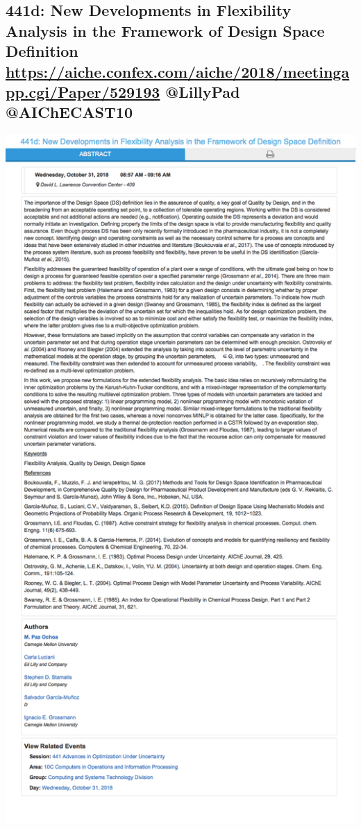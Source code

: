 \documentclass[11pt]{article}
\begin{document}
\subsection{441d: New Developments in Flexibility Analysis in the Framework of Design Space Definition \url{https://aiche.confex.com/aiche/2018/meetingapp.cgi/Paper/529193} @LillyPad @AIChECAST10}
\label{sec:orgdb385cf}
\begin{center}
\includegraphics[width=.9\linewidth]{./529193.png}
\end{center}
\end{document}
